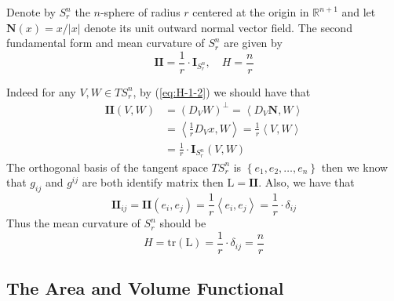 \begin{example}\label{exam:H-1-1}
    Denote by $S^n_r$ the $n$-sphere of radius $r$ centered at the origin in $\mathbb{R}^{n+1}$ and let $\mathbf{N}(x)=x/\left|x\right|$ denote its unit outward normal vector field. The second fundamental form and mean curvature of $S^n_r$ are given by
    \begin{equation*}
        \mathbf{II}=\frac{1}{r}\cdot\mathbf{I}_{S^n_r},\,\,\,\,\,\, H=\frac{n}{r}
    \end{equation*}
\end{example}

Indeed for any $V,W\in TS^n_r$, by (\ref{eq:H-1-2}) we should have that
\begin{align*}
    \mathbf{II}(V,W)&={(D_V W)}^\bot=\left<D_V\mathbf{N},W\right>\\
    &=\left<\frac{1}{r}D_V x,W\right>=\frac{1}{r}\left<V,W\right>\\
    &=\frac{1}{r}\cdot\mathbf{I}_{S^n_r}(V,W)
\end{align*}
The orthogonal basis of the tangent space $TS^n_r$ is $\left\{e_1,e_2,\dots,e_n\right\}$ then we know that $g_{ij}$ and $g^{ij}$ are both identify matrix then $\mathrm{L}=\mathbf{II}$. Also, we have that
\begin{equation*}
    \mathbf{II}_{ij}=\mathbf{II}(e_i,e_j)=\frac{1}{r}\left<e_i,e_j\right>=\frac{1}{r}\cdot\delta_{ij}
\end{equation*}
Thus the mean curvature of $S^n_r$ should be
\begin{equation*}
    H=\mathrm{tr}(\mathrm{L})=\frac{1}{r}\cdot\delta_{ij}=\frac{n}{r}
\end{equation*}

\subsection{The Area and Volume Functional}

